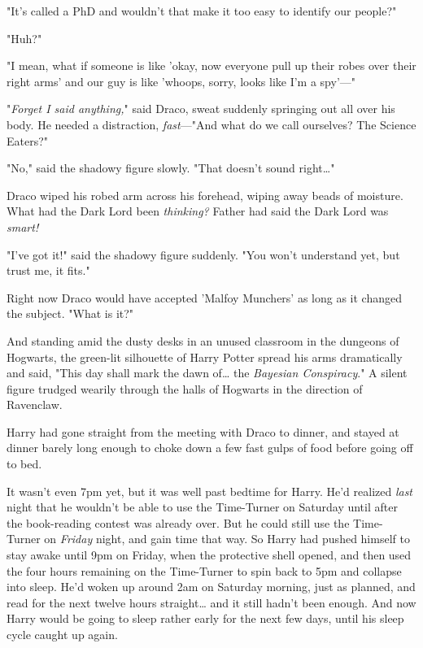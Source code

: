 "It's called a PhD and wouldn't that make it too easy to identify our people?"

"Huh?"

"I mean, what if someone is like 'okay, now everyone pull up their robes over 
their right arms' and our guy is like 'whoops, sorry, looks like I'm a spy'---"

"\emph{Forget I said anything,}" said Draco, sweat suddenly springing out all 
over his body. He needed a distraction, \emph{fast}---"And what do we call 
ourselves? The Science Eaters?"

"No," said the shadowy figure slowly. "That doesn't sound right{\ldots}"

Draco wiped his robed arm across his forehead, wiping away beads of moisture. 
What had the Dark Lord been \emph{thinking?} Father had said the Dark Lord was 
\emph{smart!}

"I've got it!" said the shadowy figure suddenly. "You won't understand yet, but 
trust me, it fits."

Right now Draco would have accepted 'Malfoy Munchers' as long as it changed the 
subject. "What is it?"

And standing amid the dusty desks in an unused classroom in the dungeons of 
Hogwarts, the green-lit silhouette of Harry Potter spread his arms dramatically 
and said, "This day shall mark the dawn of{\ldots} the \emph{Bayesian 
Conspiracy}."
\sbreak
A silent figure trudged wearily through the halls of Hogwarts in the direction 
of Ravenclaw.

Harry had gone straight from the meeting with Draco to dinner, and stayed at 
dinner barely long enough to choke down a few fast gulps of food before going 
off to bed.

It wasn't even 7pm yet, but it was well past bedtime for Harry. He'd realized 
\emph{last} night that he wouldn't be able to use the Time-Turner on Saturday 
until after the book-reading contest was already over. But he could still use 
the Time-Turner on \emph{Friday} night, and gain time that way. So Harry had 
pushed himself to stay awake until 9pm on Friday, when the protective shell 
opened, and then used the four hours remaining on the Time-Turner to spin back 
to 5pm and collapse into sleep. He'd woken up around 2am on Saturday morning, 
just as planned, and read for the next twelve hours straight{\ldots} and it 
still hadn't been enough. And now Harry would be going to sleep rather early 
for the next few days, until his sleep cycle caught up again.

